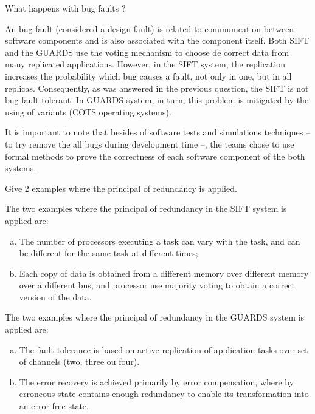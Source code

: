 \documentclass[12pt]{exam}
\begin{document}
\begin{questions}
\begin{solution}
    \end{solution}
    
    \question What happens with bug faults ?
    \begin{solution}
    
      An bug fault (considered a design fault) is related to communication between software components and is also associated  with the component itself. Both SIFT and the GUARDS use the voting mechanism to choose de correct data from many replicated applications. However, in the SIFT system, the replication increases the probability which bug causes a fault, not only in one, but in all replicas. Consequently, as was answered in the previous question, the SIFT is not bug fault tolerant. In GUARDS system, in turn, this problem is mitigated by the using of variants (COTS operating systems).   
      
      It is important to note that besides of software tests and simulations techniques -- to try remove the all bugs during development time --, the teams chose to use formal methods to prove the correctness of each software component of the both systems.
    \end{solution}    
    
    \question Give 2 examples where the principal of redundancy is applied.

    \begin{solution}
      The two examples where the principal of redundancy in the SIFT system is applied are:
      \begin{enumerate}[(a)]
	\item The number of processors executing a task can vary with the task, and can be different for the same task 
	  at different times; 
	\item Each copy of data is obtained from a different memory over different memory over a different bus, and 
	  processor use majority voting to obtain a correct version of the data.
      \end{enumerate}
    
      The two examples where the principal of redundancy in the GUARDS system is applied are:
      \begin{enumerate}[(a)]
	\item The fault-tolerance is based on active replication of application tasks over set of channels (two, three ou four). 
	\item The error recovery is achieved primarily by error compensation, where by erroneous state contains enough redundancy 
	  to enable its transformation into an error-free state. 
      \end{enumerate}  
     \end{solution}


\end{questions}
\end{document}
